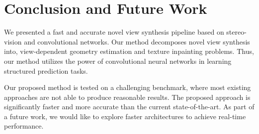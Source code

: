 \documentclass[runningheads]{llncs}
\begin{document}
\section{Conclusion and Future Work}

We presented a fast and accurate novel view synthesis pipeline based on stereo-vision and convolutional networks. Our method decomposes novel view synthesis into, view-dependent geometry estimation and texture inpainting problems. Thus, our method utilizes the power of convolutional neural networks in learning structured prediction tasks. 

Our proposed method is tested on a challenging benchmark, where most existing approaches are not able to produce reasonable results. The proposed approach is significantly faster and more accurate than the current state-of-the-art. As part of a future work, we would like to explore faster architectures to achieve real-time performance. 









\end{document}
